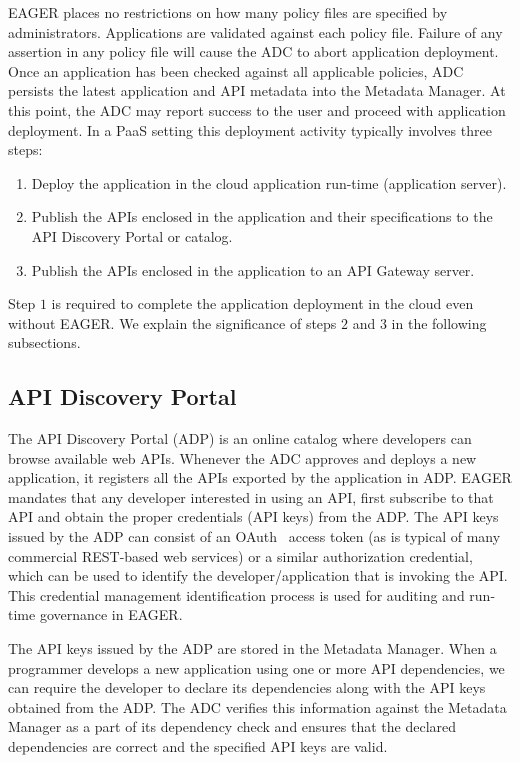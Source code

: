 EAGER places no restrictions on how many policy files are specified by 
administrators. Applications are validated against each policy file. Failure
of any assertion in any policy file will cause the ADC to abort 
application deployment. Once an application has been checked against all
applicable policies, ADC persists the latest application and API metadata into
the Metadata Manager.  At this point, the ADC may report success to the user
and proceed with application deployment. In a PaaS setting
this deployment activity typically involves three steps:

\begin{enumerate}
\vspace{0.05in}
\item Deploy the application in the cloud application run-time (application server).
\vspace{0.05in}
\item Publish the APIs enclosed in the application and their specifications to
the API Discovery Portal or catalog.
\vspace{0.05in}
\item Publish the APIs enclosed in the application to an API Gateway server.
\vspace{0.05in}
\end{enumerate}

Step $1$ is required to complete the application deployment in the cloud even
without EAGER. We explain the significance of steps $2$ and $3$ in the 
following subsections.

\subsection{API Discovery Portal} 
The API Discovery Portal (ADP) is an online
catalog where developers can browse available web APIs. Whenever the ADC
approves and deploys a new application, it registers all the APIs exported by
the application in ADP.  EAGER mandates that any developer interested in using
an API, first subscribe to that API and obtain the proper credentials (API
keys) from the ADP. The API keys issued by the ADP can consist of an
OAuth~\cite{oauth2} access
token (as is typical of many commercial REST-based web services) 
or a similar authorization credential, which can be used to identify the
developer/application that is invoking the API. This credential management
identification process is used for auditing and run-time governance in EAGER.

The API keys issued by the ADP are stored in the Metadata Manager. When a
programmer develops a new application using one or more API dependencies, we
can require the developer to declare its dependencies along with the API
keys obtained from the ADP. The ADC verifies this information against
the Metadata Manager as a part of its dependency check and ensures that the
declared dependencies are correct and the specified API keys are valid. 

